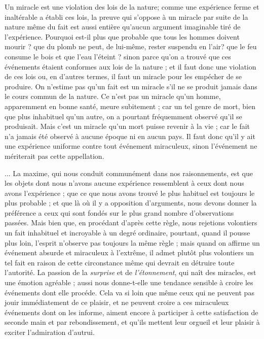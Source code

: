 Un miracle est une violation des lois de la nature;
comme une expérience ferme et inaltérable a établi ces
lois, la preuve qui s’oppose à un miracle par suite de la
nature même du fait est aussi entière qu’aucun argument
imaginable tiré de l’expérience. Pourquoi est-il plus que
probable que tous les hommes doivent mourir ? que du
plomb ne peut, de lui-même, rester suspendu en l'air?
que le feu consume le bois et que l’eau l’éteint ? sinon
parce qu’on a trouvé que ces événements étaient conformes
aux lois de la nature ; et il faut donc une violation de ces
lois ou, en d’autres termes, il faut un miracle pour les
empécher de se produire. On n’estime pas qu’un fait est un
miracle s’il ne se produit jamais dans le cours commun de
la nature. Ce n’est pas un miracle qu’un homme, apparemment 
en bonne santé, meure subitement ; car un tel genre
de mort, bien que plus inhabituel qu’un autre, on a pourtant
fréquemment observé qu’il se produisait. Mais c’est
un miracle qu’un mort puisse revenir à la vie ; car le fait
n’a jamais été observé à aucune époque ni en aucun pays.
Il faut donc qu’il y ait une expérience uniforme contre
tout événement miraculeux, sinon l’événement ne mériterait
pas cette appellation.

... La maxime, qui nous conduit communément dans
nos raisonnements, est que les objets dont nous n’avons
aucune expérience ressemblent à ceux dont nous avons
l'expérience ; que ce que nous avons trouvé le plus habituel
est toujours le plus probable ; et que là où il y a opposition
d’arguments, nous devons donner la préférence a ceux
qui sont fondés sur le plus grand nombre d’observations
passées. Mais bien que, en procédant d’après cette règle,
nous rejetions volontiers un fait inhabituel et incroyable
à un degré ordinaire, pourtant, quand il pousse plus loin,
l'esprit n’observe pas toujours la même règle ; mais quand
on affirme un événement absurde et miraculeux à l’extrême,
il admet plutôt plus volontiers un tel fait en raison de
cette circonstance même qui devrait en détruire toute
l'autorité. La passion de la {\it surprise} et de {\it l’étonnement},
qui naît des miracles, est une émotion agréable ; aussi
nous donne-t-elle une tendance sensible à croire les événements
dont elle procéde. Cela va si loin que même
ceux qui ne peuvent pas jouir immédiatement de ce
plaisir, et ne peuvent croire a ces miraculeux événements
dont on les informe, aiment encore à participer à cette
satisfaction de seconde main et par rebondissement, et
qu'ils mettent leur orgueil et leur plaisir à exciter l'admiration
d’autrui.


